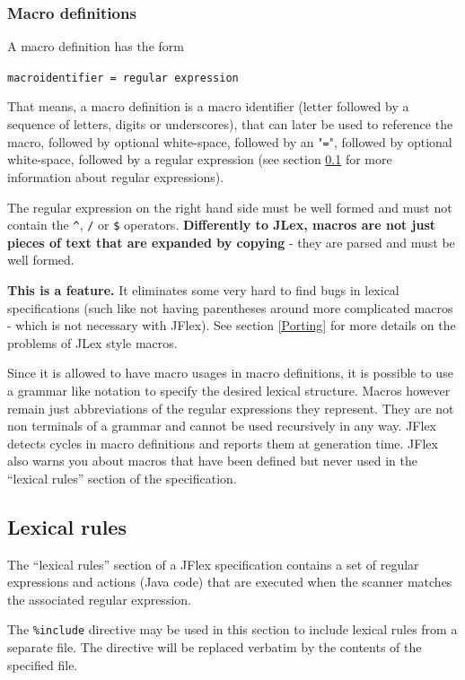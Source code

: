 \documentclass[11pt]{scrartcl}
\begin{document}
\subsubsection{Macro definitions}\label{MacroDefs}
A macro definition has the form

\texttt{macroidentifier = regular expression}

That means, a macro definition is a macro identifier (letter followed
by a sequence of letters, digits or underscores), that can later be
used to reference the macro, followed by optional white-space, followed
by an "\texttt{=}", followed by optional white-space, followed by a
regular expression (see section \ref{LexRules}  for more information about regular expressions).

The regular expression on the right hand side must be well formed and
must not contain the \verb+^+, \texttt{/} or \texttt{\$} operators. \textbf{Differently
to JLex, macros are not just pieces of text that are expanded by copying}
- they are parsed and must be well formed.

\textbf{This is a feature.} It eliminates some very hard to find bugs in
lexical specifications (such like not having parentheses around more
complicated macros - which is not necessary with JFlex).  See section
\ref{Porting}  for more
details on the problems of JLex style macros.

Since it is allowed to have macro usages in macro definitions, it is
possible to use a grammar like notation to specify the desired lexical
structure. Macros however remain just abbreviations of the regular expressions
they represent. They are not non terminals of a grammar and cannot be used
recursively in any way. JFlex detects cycles in macro definitions and reports
them at generation time. JFlex also warns you about macros that have been
defined but never used in the ``lexical rules'' section of the specification.
  
\subsection{Lexical rules}\label{LexRules}
The ``lexical rules'' section of a JFlex specification contains a set of
regular expressions and actions (Java code) that are executed when the
scanner matches the associated regular expression.

The \texttt{\%include} directive may be used in this section to include
lexical rules from a separate file.  The directive will be replaced verbatim
by the contents of the specified file.
 
\end{document}
